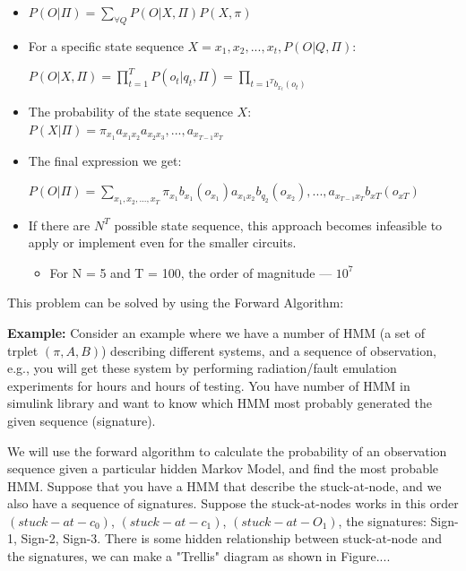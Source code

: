 \begin{itemize}

\item  $P(O | \Pi) = \sum\limits_{\forall Q}^{} P (O | X, \Pi) P (X, \pi)$ 

\item For a specific state sequence $X = {x_1, x_2,...,x_t}, P(O | Q, \Pi):$

 \hspace {0.2cm} $P (O | X, \Pi) = \prod_{t=1}^{T} P (o_t | q_t, \Pi) = \prod_{t=1^{T} b_{x_t} (o_t)}$
 
 \item The probability of the state sequence $X$:
 \\
 \hspace {0.2cm} $ P (X | \Pi ) = \pi_{x_1} a_{x_1 x_2} a_{x_2 x_3},...,a_{x_{T-1} x_T}$
 
 \item The final expression we get:
 


$P (O | \Pi ) = \sum\limits_{x_1, x_2,..., x_T} \pi_{x_1} b_{x_1} (o_{x_1}) a_{x_1 x_2} b_{q_2} (o_{x_2}),..., a_{x_{T-1} x_T} b_{xT} (o_{xT})$

\item If there are $N^T$ possible state sequence, this approach becomes infeasible to apply or implement even for the smaller circuits.

\begin{itemize}
\item For N = 5 and T = 100, the order of magnitude --- $10^7$
\end{itemize}
 

\end{itemize}

This problem can be solved by using the Forward Algorithm:

\textbf{Example:} Consider an example where we have a number of HMM (a set of trplet $(\pi, A, B)$) describing different systems, and a sequence of observation, e.g., you will get these system by performing radiation/fault emulation experiments for hours and hours of testing. You have number of HMM in simulink library and want to know which HMM most probably generated the given sequence (signature).


We will use the forward algorithm to calculate the probability of an observation sequence given a particular hidden Markov Model, and find the most probable HMM. Suppose that you have a HMM that describe the stuck-at-node, and we also have a sequence of signatures. Suppose the stuck-at-nodes works in this order $(stuck-at-c_0)$, $(stuck-at-c_1)$, $(stuck-at-O_1)$, the signatures: Sign-1, Sign-2, Sign-3. There is some hidden relationship between stuck-at-node and the signatures, we can make a "Trellis" diagram as shown in Figure....


